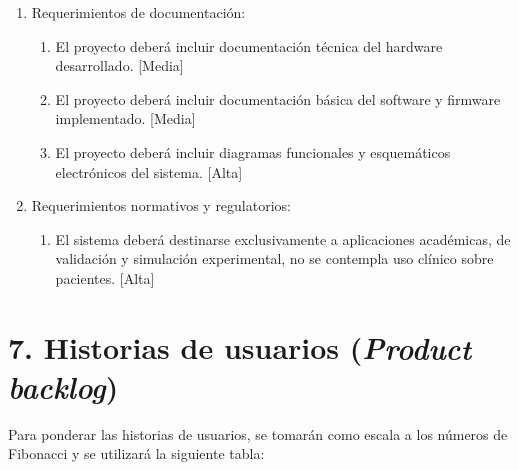 \documentclass[
11pt, %
]{charter}
\begin{document}
\begin{enumerate}
\begin{enumerate}
		\item Se deberá verificar la estabilidad de funcionamiento del sistema durante sesiones continuas de operación. [Alta]
		
	\end{enumerate}
	
	
	\item Requerimientos de documentación:
	\begin{enumerate}
	
		\item El proyecto deberá incluir documentación técnica del hardware desarrollado. [Media]
		
		\item El proyecto deberá incluir documentación básica del software y firmware implementado. [Media]
		
		\item El proyecto deberá incluir diagramas funcionales y esquemáticos electrónicos del sistema. [Alta]
		
	\end{enumerate}
	
	
	\item Requerimientos normativos y regulatorios:
	\begin{enumerate}
		
		\item El sistema deberá destinarse exclusivamente a aplicaciones académicas, de validación y simulación experimental, no se contempla uso clínico sobre pacientes. [Alta]
		
	\end{enumerate}

\end{enumerate}


\section{7. Historias de usuarios (\textit{Product backlog})}
\label{sec:backlog}

Para ponderar las historias de usuarios, se tomarán como escala a los números de Fibonacci y
se utilizará la siguiente tabla:

\end{document}
